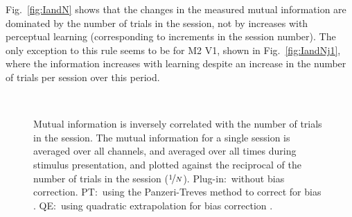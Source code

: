 Fig.~\ref{fig:IandN} shows that the changes in the measured mutual information are dominated by the number of trials in the session, not by increases with perceptual learning (corresponding to increments in the session number).
The only exception to this rule seems to be for \ac{M2} \ac{V1}, shown in Fig.~\ref{fig:IandNj1}, where the information increases with learning despite an increase in the number of trials per session over this period.

% 
% 
\begin{figure}[htbp]
    \\
    \caption{Mutual information is inversely correlated with the number of trials in the session. The mutual information for a single session is averaged over all channels, and averaged over all times during stimulus presentation, and plotted against the reciprocal of the number of trials in the session ($\nicefrac{1}{N}$). Plug-in:~without bias correction. \ac{PT}:~using the Panzeri-Treves method to correct for bias \citep{Panzeri1996}. \ac{QE}:~using quadratic extrapolation for bias correction \citep{Strong1998}.
}
    \label{fig:IvN}
\end{figure}


